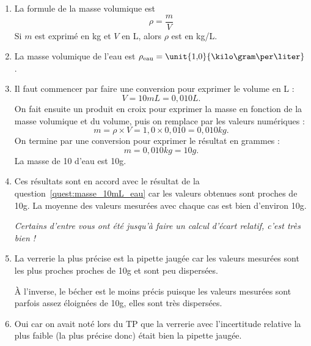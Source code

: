 \begin{enumerate}
\item La formule de la masse volumique est
\begin{equation}
\rho = \frac{m}{V}
\nonumber
\end{equation}
Si $m$ est exprimé en kg et $V$ en L, alors $\rho$ est en kg/L.

\item La masse volumique de l'eau est $\rho_\mathrm{eau} = \unit{1{,}0}{\kilo\gram\per\liter}$.
\label{quest:masse_volumique_eau}

\item Il faut commencer par faire une conversion pour exprimer le volume en L :
\begin{equation}
V = \unit{10}{mL}=\unit{0{,}010}{L}.
\nonumber
\end{equation}
On fait ensuite un \og produit en croix\fg{} pour exprimer la masse en fonction de la masse volumique et du volume, puis on remplace par les valeurs numériques :
\begin{equation}
m = \rho \times V = 1{,}0 \times 0{,}010 = \unit{0{,}010}{kg}.
\nonumber
\end{equation}
On termine par une conversion pour exprimer le résultat en grammes :
\begin{equation}
m = \unit{0{,}010}{kg} = \unit{10}{g}.
\nonumber
\end{equation}
La masse de \unit{10}{\milli\liter} d'eau est \unit{10}{g}.
\label{quest:masse_10mL_eau}

\item Ces résultats sont en accord avec le résultat de la question~\ref{quest:masse_10mL_eau} car les valeurs obtenues sont proches de \unit{10}{g}.
La moyenne des valeurs mesurées avec chaque cas est bien d'environ \unit{10}{g}.

\emph{Certains d'entre vous ont été jusqu'à faire un calcul d'écart relatif, c'est très bien !}

\item La verrerie la plus précise est la pipette jaugée car les valeurs mesurées sont les plus proches proches de \unit{10}{g} et sont peu dispersées.

À l'inverse, le bécher est le moins précis puisque les valeurs mesurées sont parfois assez éloignées de \unit{10}{g}, elles sont très dispersées.

\item Oui car on avait noté lors du TP que la verrerie avec l'incertitude relative la plus faible (la plus précise donc) était bien la pipette jaugée.


\end{enumerate}
